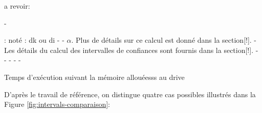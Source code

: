 a revoir:

-  \item[alpha ]: noté  : dk ou di
-
-  $\alpha$. Plus de détails sur ce calcul est donné dans la section[!].
-  Les détails du calcul des intervalles de confiances sont fournis dans la section[!].
-
-
-
-
-

Temps d'exécution suivant la mémoire allouéesss au drive

D'après le travail de référence, on distingue quatre cas possibles  illustrés dans la Figure 	\ref{fig:intervals-comparaison}: